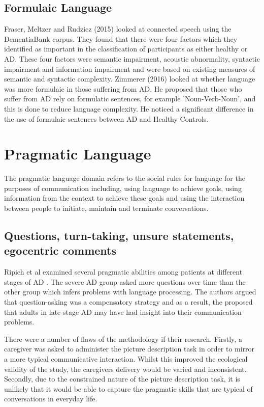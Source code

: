 \documentclass[10pt, letterpaper, twoside, openany]{book}
\begin{document}
\subsection{Formulaic Language}
Fraser, Meltzer and Rudzicz (2015) \cite{Fraser2015} looked at connected speech using the DementiaBank corpus. They found that there were four factors which they identified as important in the classification of participants as either healthy or AD. These four factors were semantic impairment, acoustic abnormality, syntactic impairment and information impairment and were based on existing measures of semantic and syntactic complexity. Zimmerer (2016) \cite{Zimmerer2016} looked at whether language was more formulaic in those suffering from AD. He proposed that those who suffer from AD rely on formulatic sentences, for example 'Noun-Verb-Noun', and this is done to reduce language complexity. He noticed a significant difference in the use of formulaic sentences between AD and Healthy Controls.
\par
\section{Pragmatic Language}
The pragmatic language domain refers to the social rules for language for the purposes of communication including, using language to achieve goals, using information from the context to achieve these goals and using the interaction between people to initiate, maintain and terminate conversations.
\subsection{Questions, turn-taking, unsure statements, egocentric comments}
Ripich et al examined several pragmatic abilities among patients at different stages of AD \cite{Ripich1988}. The severe AD group asked more questions over time than the other group which infers problems with language processing. The authors argued that question-asking was a compensatory strategy and as a result, the proposed that adults in late-stage AD may have had insight into their communication problems. 
\par 
There were a number of flaws of the methodology if their research. Firstly, a caregiver was asked to administer the picture description task in order to mirror a more typical communicative interaction. Whilst this improved the ecological validity of the study, the caregivers delivery would be varied and inconsistent. Secondly, due to the constrained nature of the picture description task, it is unlikely that it would be able to capture the pragmatic skills that are typical of conversations in everyday life.
\end{document}
